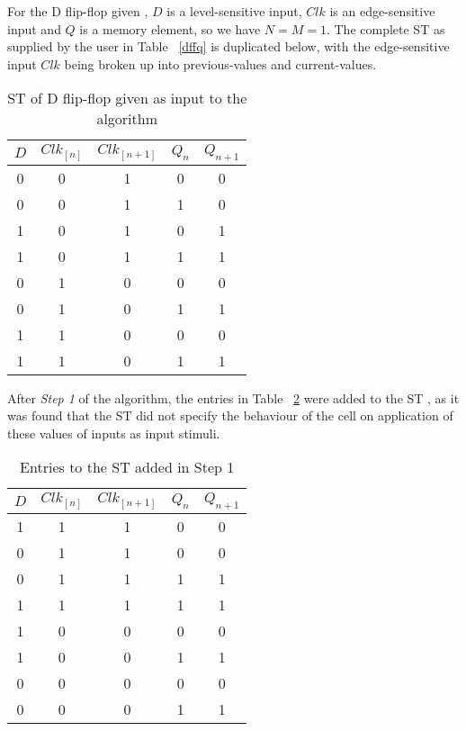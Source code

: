 \documentclass[final]{ieee}
\begin{document}
For the D flip-flop given , $D$ is a level-sensitive input, $Clk$ is an edge-sensitive input and $Q$ is a memory element,  so we have $N=M=1$. The complete ST as supplied by the user in Table ~\ref{dffq} is duplicated below, with the edge-sensitive input $Clk$ being broken up into previous-values and current-values.

\begin{table}
\begin{center}
\begin{tabular}{|c|c|c|c|c|} \hline
$D$ & $Clk_{[n]}$ & $Clk_{[n+1]}$ & $Q_{n}$ & $Q_{n+1}$ \\ \hline
0   &   0   &   1   &    0    & 0 \\
0   &   0   &   1   &    1    & 0 \\
1   &   0   &   1   &    0    & 1 \\
1   &   0   &   1   &    1    & 1 \\
0   &   1   &   0   &    0    & 0 \\
0   &   1   &   0   &    1    & 1 \\
1   &   1   &   0   &    0    & 0 \\
1   &   1   &   0   &    1    & 1 \\ \hline
\end{tabular}
\caption{ST of D flip-flop given as input to the algorithm} \label{dffq_2}
\end{center}
\end{table}

After \textit{Step 1} of the algorithm, the entries in Table ~\ref{dffq_new} were added to the ST , as it was found that the ST did not specify the behaviour of the cell on application of these values of inputs as input stimuli.

\begin{table}
\begin{center}
\begin{tabular}{|c|c|c|c|c|} \hline
$D$ & $Clk_{[n]}$ & $Clk_{[n+1]}$ & $Q_{n}$ & $Q_{n+1}$ \\ \hline
1   &   1   &   1   &    0    & 0 \\
0   &   1   &   1   &    0    & 0 \\
0   &   1   &   1   &    1    & 1 \\
1   &   1   &   1   &    1    & 1 \\
1   &   0   &   0   &    0    & 0 \\
1   &   0   &   0   &    1    & 1 \\
0   &   0   &   0   &    0    & 0 \\
0   &   0   &   0   &    1    & 1 \\ \hline
\end{tabular}
\caption{Entries to the ST added in Step 1} \label{dffq_new}
\end{center}
\end{table} 
\end{document}
